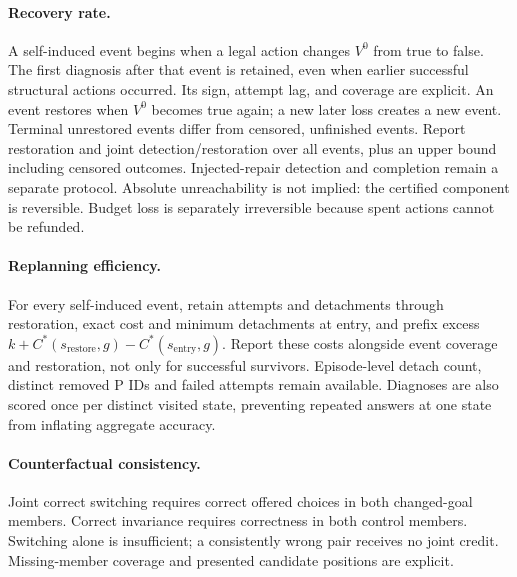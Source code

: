 \documentclass[10pt,twocolumn]{article}
\begin{document}
\paragraph{Recovery rate.}
A self-induced event begins when a legal action changes $V^0$ from true to
false. The first diagnosis after that event is retained, even when earlier
successful structural actions occurred. Its sign, attempt lag, and coverage
are explicit. An event restores when $V^0$ becomes true again; a new later
loss creates a new event. Terminal unrestored events differ from censored,
unfinished events. Report restoration and joint detection/restoration over
all events, plus an upper bound including censored outcomes.
Injected-repair detection and completion remain a separate protocol.
Absolute unreachability is not implied: the certified component is reversible.
Budget loss is separately irreversible because spent actions cannot be refunded.

\paragraph{Replanning efficiency.}
For every self-induced event, retain attempts and detachments through
restoration, exact cost and minimum detachments at entry, and prefix excess
$k+C^*(s_{\mathrm{restore}},g)-C^*(s_{\mathrm{entry}},g)$.
Report these costs alongside event coverage and restoration, not only for
successful survivors. Episode-level detach count, distinct removed P IDs and
failed attempts remain available. Diagnoses are also scored once per
distinct visited state, preventing repeated answers at one state from
inflating aggregate accuracy.

\paragraph{Counterfactual consistency.}
Joint correct switching requires correct offered choices in both changed-goal
members. Correct invariance requires correctness in both control members.
Switching alone is insufficient; a consistently wrong pair receives no joint
credit. Missing-member coverage and presented candidate positions are explicit.
\end{document}
